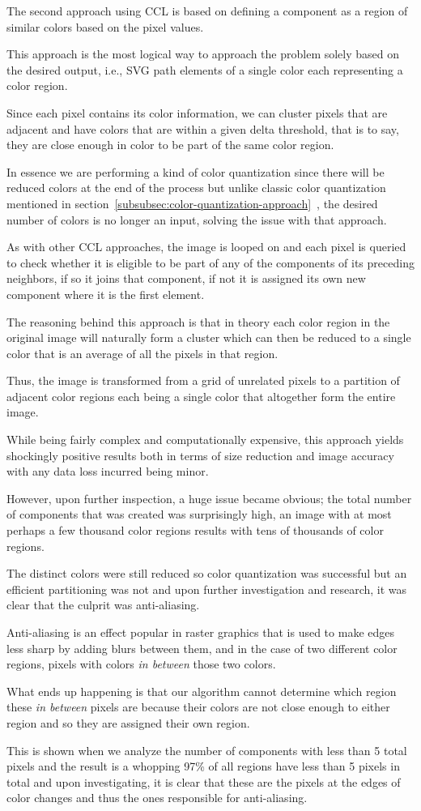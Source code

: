 \documentclass[12pt]{article}
\newcommand{\sentence}{} %
\newcommand{\italic}[1]{\textit{#1}}
\newcommand{\fullref}[1]{\ref{#1}~\nameref{#1}}
\begin{document}
    \tab
    The second approach using CCL is based on defining a component as a region of similar colors based on the pixel
    values.
    \sentence
    This approach is the most logical way to approach the problem solely based on the desired output, i.e., SVG path
    elements of a single color each representing a color region.
    \sentence
    Since each pixel contains its color information, we can cluster pixels that are adjacent and have colors that are
    within a given delta threshold, that is to say, they are close enough in color to be part of the same color
    region.
    \sentence
    In essence we are performing a kind of color quantization since there will be reduced colors at the end of the
    process but unlike classic color quantization mentioned in
    section~\fullref{subsubsec:color-quantization-approach}, the desired number of colors is no longer an input,
    solving the issue with that approach.
    \sentence
    As with other CCL approaches, the image is looped on and each pixel is queried to check whether it is eligible to
    be part of any of the components of its preceding neighbors, if so it joins that component, if not it is assigned
    its own new component where it is the first element.
    \sentence
    The reasoning behind this approach is that in theory each color region in the original image will naturally form
    a cluster which can then be reduced to a single color that is an average of all the pixels in that region.
    \sentence
    Thus, the image is transformed from a grid of unrelated pixels to a partition of adjacent color regions each
    being a single color that altogether form the entire image.
    \sentence

    \bigskip
    While being fairly complex and computationally expensive, this approach yields shockingly positive results both
    in terms of size reduction and image accuracy with any data loss incurred being minor.
    \sentence
    However, upon further inspection, a huge issue became obvious;
    the total number of components that was created was surprisingly high, an image with at most perhaps a few
    thousand color regions results with tens of thousands of color regions.
    \sentence
    The distinct colors were still reduced so color quantization was successful but an efficient partitioning was not
    and upon further investigation and research, it was clear that the culprit was anti-aliasing.
    \sentence
    Anti-aliasing is an effect popular in raster graphics that is used to make edges less sharp by adding blurs
    between them, and in the case of two different color regions, pixels with colors \italic{in between} those two
    colors.
    \sentence
    What ends up happening is that our algorithm cannot determine which region these \italic{in between} pixels are
    because their colors are not close enough to either region and so they are assigned their own region.
    \sentence
    This is shown when we analyze the number of components with less than 5 total pixels and the result is a whopping
    97\% of all regions have less than 5 pixels in total and upon investigating, it is clear that these are the
    pixels at the edges of color changes and thus the ones responsible for anti-aliasing.
    \sentence
\end{document}
